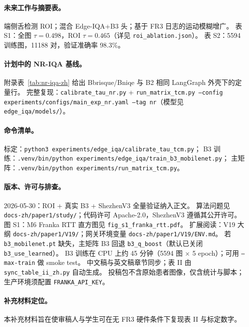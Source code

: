 \paragraph{未来工作与摘要表。}
端侧舌检测 ROI；混合 Edge-IQA+B3 头；基于 FR3 日志的运动模糊增广。
表 S1：全图 $\tau{=}0.498$，ROI $\tau{=}0.465$（详见 \texttt{roi\_ablation.json}）。
表 S2：5594 训练图，11188 对，验证准确率 98.3\%。

\paragraph{计划中的 NR-IQA 基线。}
附录表~\ref{tab:nr-iqa-zh} 给出 Bbrisque/Bniqe 与 B2 相同 LangGraph 外壳下的定量行。
完整复现：\texttt{calibrate\_tau\_nr.py} + \texttt{run\_matrix\_tcm.py --config experiments/configs/main\_exp\_nr.yaml --tag nr}（模型见 \texttt{edge\_iqa/models/}）。

\paragraph{命令清单。}
标定：\texttt{python3 experiments/edge\_iqa/calibrate\_tau\_tcm.py}；
B3 训练：\texttt{.venv/bin/python experiments/edge\_iqa/train\_b3\_mobilenet.py}；
主矩阵：\texttt{.venv/bin/python experiments/run\_matrix\_tcm.py}。

\paragraph{版本、许可与排查。}
2026-05-30：ROI + 真实 B3 + ShezhenV3 全量验证纳入正文。
算法问题见 \texttt{docs-zh/paper1/study/}；代码许可 Apache-2.0，ShezhenV3 遵循其公开许可。
图 S1：M6 Franka RTT 直方图见 \texttt{fig\_s1\_franka\_rtt.pdf}。
扩展阅读：V19 大纲 \texttt{docs-zh/paper1/V19/}；网关环境变量 \texttt{docs-zh/paper1/V19/ENV.md}。
若 \texttt{b3\_mobilenet.pt} 缺失，主矩阵 B3 回退 \texttt{b3\_q\_boost}（默认已关闭 \texttt{b3\_use\_learned}）。
B3 训练在 CPU 上约 45 分钟（5594 图 $\times$ 5 epoch）；可用 \texttt{--max-train} 做 smoke test。
中文稿与英文稿章节同步；表 II 由 \texttt{sync\_table\_ii\_zh.py} 自动生成。
投稿包不含原始患者图像，仅含统计与脚本；生产环境须配置 \texttt{FRANKA\_API\_KEY}。

\paragraph{补充材料定位。}
本补充材料旨在使审稿人与学生可在无 FR3 硬件条件下复现表 II 与标定数字。
